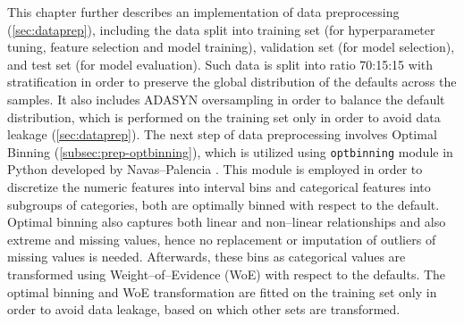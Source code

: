 This chapter further describes an implementation of data preprocessing (\autoref{sec:dataprep}), including the data split into training set (for hyperparameter tuning, feature selection and model training), validation set (for model selection), and test set (for model evaluation).
Such data is split into ratio 70:15:15 with stratification in order to preserve the global distribution of the defaults across the samples. It also includes ADASYN oversampling in order to balance the default distribution, which is performed on the training set only in order to avoid data leakage (\autoref{sec:dataprep}).
The next step of data preprocessing involves Optimal Binning (\autoref{subsec:prep-optbinning}), which is utilized using \lstinline{optbinning} module in Python developed by Navas--Palencia \citep{navas2020optimal}.
This module is employed in order to discretize the numeric features into interval bins and categorical features into subgroups of categories, both are optimally binned with respect to the default.
Optimal binning also captures both linear and non--linear relationships and also extreme and missing values, hence no replacement or imputation of outliers of missing values is needed.
Afterwards, these bins as categorical values are transformed using Weight--of--Evidence (WoE) with respect to the defaults. The optimal binning and WoE transformation are fitted on the training set only in order to avoid data leakage, based on which other sets are transformed.


